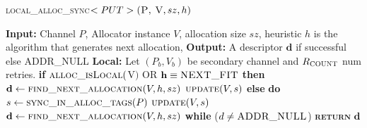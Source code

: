 \documentclass[10pt]{article}
\begin{document}

\begin{algorithm}{}
\footnotesize
\caption{\textsc{local\_alloc\_sync}{$<PUT>\textsc{(P, V}, sz, h)$}}
\label{alg:lalloc} 
\begin{algorithmic}[1]


\STATE \textbf{Input:} Channel $P$, Allocator instance $V$, allocation size $sz$, heuristic $h$
is the algorithm that generates next allocation, 
\STATE \textbf{Output:} A descriptor {$\textbf{d}$} if successful else \textsc{ADDR\_NULL}
\STATE \textbf{Local:} Let $(P_{b}, V_{b})$ be secondary channel and $R_{\textsc{COUNT}}$ num retries.
\STATE \textbf{if} $\textsc{alloc\_isLocal}($V$)$ OR $\textbf{h} \equiv \textsc{NEXT\_FIT}$  \textbf{then} 
\STATE \quad $\textbf{d} \leftarrow  \textsc{find\_next\_allocation}(V, h, sz)$ 
\STATE \quad $\textsc{update}(V, s)$
\STATE \textbf{else}
\STATE \quad \textbf{do}
\STATE \qquad $s \gets \textsc{sync\_in\_alloc\_tags}(P)$
\STATE \qquad $\textsc{update}(V, s)$
\STATE \qquad $\textbf{d} \leftarrow  \textsc{find\_next\_allocation}(V, h, sz)$
\STATE \quad \textbf{while} ($d \neq \textsc{ADDR\_NULL}$)
\STATE \textsc{\textbf{return}} {$\textbf{d}$}
\STATE


\end{algorithmic}
\end{algorithm}


\end{document}
